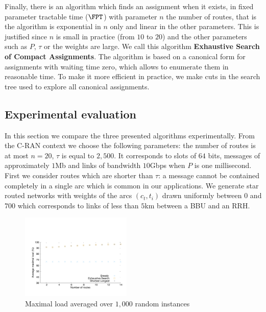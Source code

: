 \documentclass[10pt, conference, letterpaper]{IEEEtran}
\begin{document}
Finally, there is an algorithm which finds an assignment when it exists, in fixed parameter tractable time ($\FPT$) with parameter $n$ the number of routes, that is the algorithm is exponential in $n$ only and linear in the other parameters. This is justified since $n$ is small in practice (from $10$ to $20$) and the other parameters such as $P$, $\tau$ or the weights are large. We call this algorithm \textbf{Exhaustive Search of Compact Assignments}. The algorithm is based on a canonical form for assignments with waiting time zero, which allows to enumerate them in reasonable time. To make it more efficient in practice, we make cuts in the search tree used to explore all canonical assignments. 

   \subsection{Experimental evaluation}\label{sec:exp_PAZL}
   
   In this section we compare the three presented algorithms experimentally. From the C-RAN context we choose the following parameters: the number of routes is at most $n = 20$, $\tau$ is equal to $2,500$. It corresponds to slots of $64$ bits, messages of approximately $1$Mb and links of bandwidth $10$Gbps when $P$ is one millisecond.       
      First we consider routes which are shorter than $\tau$: a message cannot be contained completely in a single arc which is common in our applications. We generate star routed networks with weights of the arcs $(c_t,t_i)$ drawn uniformly between $0$ and $700$ which corresponds to links of less than $5$km between a BBU and an RRH. 

        
      \begin{figure}[h]
      \begin{center}
	 \includegraphics[width=0.47\textwidth]{periode_petite.pdf}
      \end{center}
      \caption{Maximal load averaged over $1,000$ random instances}\label{fig:short}
      \end{figure}
      
\end{document}
